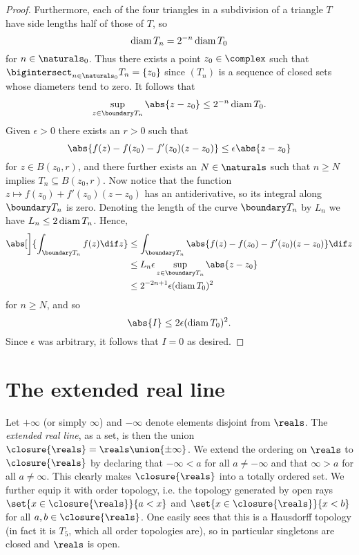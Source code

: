 \documentclass[article, a4paper, 11pt, oneside]{memoir}
\numberwithin{equation}{chapter}
\begin{document}
\begin{proof}
    Furthermore, each of the four triangles in a subdivision of a triangle $T$ have side lengths half of those of $T$, so
    \begin{equation*}
        \operatorname{diam} T_n
            = 2^{-n} \operatorname{diam} T_0
    \end{equation*}
    for $n \in \naturals_0$. Thus there exists a point $z_0 \in \complex$ such that $\bigintersect_{n\in\naturals_0} T_n = \{ z_0 \}$ since $(T_n)$ is a sequence of closed sets whose diameters tend to zero. It follows that
    \begin{equation*}
        \sup_{z \in \boundary T_n} \abs{z - z_0}
            \leq 2^{-n} \diam T_0.
    \end{equation*}
    Given $\epsilon > 0$ there exists an $r > 0$ such that
    \begin{equation*}
        \abs{ f(z) - f(z_0) - f'(z_0)(z - z_0) }
            \leq \epsilon \abs{z - z_0}
    \end{equation*}
    for $z \in B(z_0,r)$, and there further exists an $N \in \naturals$ such that $n \geq N$ implies $T_n \subseteq B(z_0,r)$. Now notice that the function $z \mapsto f(z_0) + f'(z_0)(z - z_0)$ has an antiderivative, so its integral along $\boundary T_n$ is zero. Denoting the length of the curve $\boundary T_n$ by $L_n$ we have $L_n \leq 2 \operatorname{diam} T_n$. Hence,
    \begin{align*}
        \abs[\bigg]{ \int_{\boundary T_n} f(z) \dif z }
            &\leq \int_{\boundary T_n} \abs{ f(z) - f(z_0) - f'(z_0)(z - z_0) } \dif z \\
            &\leq L_n \epsilon \sup_{z \in \boundary T_n} \abs{z - z_0} \\
            &\leq 2^{-2n+1} \epsilon (\diam T_0)^2
    \end{align*}
    for $n \geq N$, and so
    \begin{equation*}
        \abs{I}
            \leq 2 \epsilon (\diam T_0)^2.
    \end{equation*}
    Since $\epsilon$ was arbitrary, it follows that $I = 0$ as desired.
\end{proof}


\chapter{The extended real line}

\newcommand{\exreals}{\closure{\reals}}

Let $+\infty$ (or simply $\infty$) and $-\infty$ denote elements disjoint from $\reals$. The \emph{extended real line}, as a set, is then the union $\exreals = \reals \union \{\pm\infty\}$. We extend the ordering on $\reals$ to $\exreals$ by declaring that $-\infty < a$ for all $a \neq -\infty$ and that $\infty > a$ for all $a \neq \infty$. This clearly makes $\exreals$ into a totally ordered set. We further equip it with order topology, i.e. the topology generated by open rays $\set{x \in \exreals}{a < x}$ and $\set{x \in \exreals}{x < b}$ for all $a,b \in \exreals$. One easily sees that this is a Hausdorff topology (in fact it is $T_5$, which all order topologies are), so in particular singletons are closed and $\reals$ is open.
\end{document}
